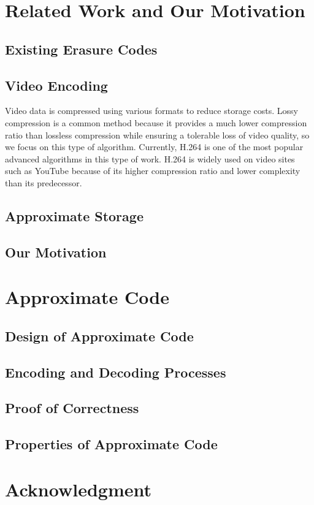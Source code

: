 \documentclass[conference]{IEEEtran}
\begin{document}
\section{Related Work and Our Motivation}
\subsection{Existing Erasure Codes}

\subsection{Video Encoding}
Video data is compressed using various formats to reduce storage costs. Lossy compression is a common method because it provides a much lower compression ratio than lossless compression while ensuring a tolerable loss of video quality, so we focus on this type of algorithm. Currently, H.264 is one of the most popular advanced algorithms in this type of work. H.264 is widely used on video sites such as YouTube because of its higher compression ratio and lower complexity than its predecessor.

\subsection{Approximate Storage}
\subsection{Our Motivation}

\section{Approximate Code}
\subsection{Design of Approximate Code}
\subsection{Encoding and Decoding Processes}
\subsection{Proof of Correctness}
\subsection{Properties of Approximate Code}




\section*{Acknowledgment}



\end{document}
